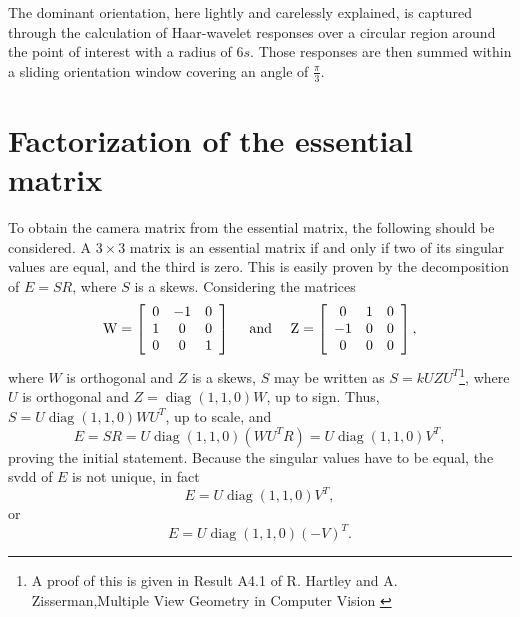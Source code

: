 The dominant orientation, here lightly and carelessly explained, is captured through the calculation of Haar-wavelet responses over a circular region around the point of interest with a radius of 6$s$. Those responses are then summed within a sliding orientation window covering an angle of $\frac{\pi}{3}$. \cite{surf} \cite{compsiftsurf}

\section{Factorization of the essential matrix}
\label{appendix:cha1:epipolar}
To obtain the camera matrix from the essential matrix, the following should be considered.
A $3 \times 3$ matrix is an essential matrix if and only if two of its singular values are equal, and the third is zero. This is easily proven by the decomposition of $E = SR$, where $S$ is a \gls{skews}.
Considering the matrices 
\begin{equation}
\mathrm { W } = \left[ \begin{array} { c c c } { 0 } & { - 1 } & { 0 } \\ { 1 } & { 0 } & { 0 } \\ { 0 } & { 0 } & { 1 } \end{array} \right] \quad \text { and } \quad \mathrm { Z } = \left[ \begin{array} { c c c } { 0 } & { 1 } & { 0 } \\ { - 1 } & { 0 } & { 0 } \\ { 0 } & { 0 } & { 0 } \end{array} \right],
\end{equation}
where $W$ is orthogonal and $Z$ is a \gls{skews}, $S$ may be written as $S = kUZU^T$\footnote{A proof of this is given in Result A4.1 of R. Hartley and A. Zisserman,Multiple View Geometry in Computer Vision \cite{multiview}}, where $U$ is orthogonal and $Z = \operatorname{diag}(1,1,0)W$, up to sign. Thus, $S = U \operatorname { diag } ( 1,1,0 ) WU^T$, up to scale, and 
\begin{equation}
E = SR = U \operatorname { diag } ( 1,1,0 ) \left( WU^T R \right) = U \operatorname { diag } ( 1,1,0 ) V^T,
\end{equation}
proving the initial statement.
Because the singular values have to be equal, the \acrshort{svdd} of $E$ is not unique, in fact 
\begin{equation}
\label{gf}
E = U \operatorname { diag } ( 1,1,0 ) V ^ { T },
\end{equation}
or 
\begin{equation}
E = U \operatorname { diag } ( 1,1,0 ) ( - V ) ^ { T }.
\end{equation} 
